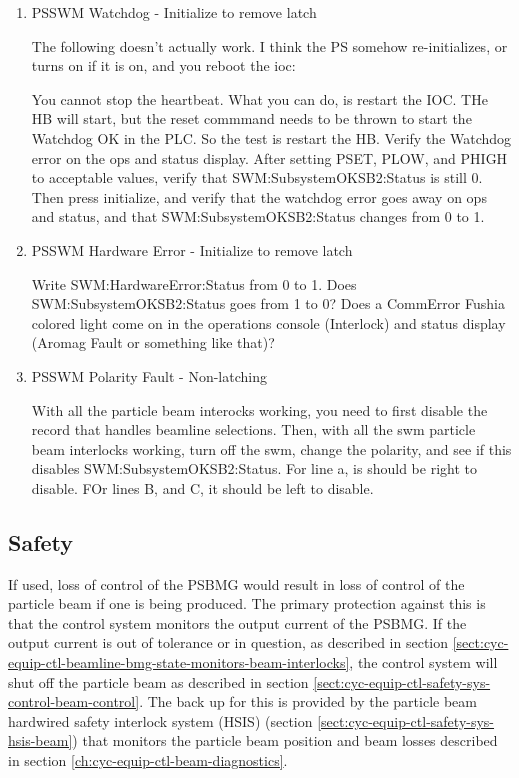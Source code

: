\documentclass[11pt]{book}		%
\begin{document}
\begin{enumerate}
 \item PSSWM Watchdog - Initialize to remove latch

\color{red}

The following doesn't actually work. I think the PS somehow re-initializes, or turns on if it is on, and you reboot the ioc:

You cannot stop the heartbeat. What you can do, is restart the IOC. THe HB will start, but the reset commmand needs to be thrown to start the Watchdog OK in the PLC. So the test is restart the HB. Verify the Watchdog error on the ops and status display. After setting PSET, PLOW, and PHIGH to acceptable values, verify that SWM:SubsystemOKSB2:Status is still 0. Then press initialize, and verify that the watchdog error goes away on ops and status, and that SWM:SubsystemOKSB2:Status changes from 0 to 1.
\color{black}

 \item PSSWM Hardware Error - Initialize to remove latch

\color{red}
Write SWM:HardwareError:Status from 0 to 1. Does SWM:SubsystemOKSB2:Status goes from 1 to 0? Does a CommError Fushia colored light come on in the operations console (Interlock) and status display (Aromag Fault or something like that)?
\color{black}

 \item PSSWM Polarity Fault - Non-latching

\color{red}
With all the particle beam interocks working, you need to first disable the record that handles beamline selections. Then, with all the swm particle beam interlocks working, turn off the swm, change the polarity, and see if this disables SWM:SubsystemOKSB2:Status. For line a, is should be right to disable. FOr lines B, and C, it should be left to disable.
\color{black}


\end{enumerate}


\subsection{Safety}

If used, loss of control of the PSBMG would result in loss of control of the particle beam if one is being produced.  The primary protection against this is that the control system monitors the output current of the PSBMG.  If the output current is out of tolerance or in question, as described in section \ref{sect:cyc-equip-ctl-beamline-bmg-state-monitors-beam-interlocks}, the control system will shut off the particle beam as described in section \ref{sect:cyc-equip-ctl-safety-sys-control-beam-control}.  The back up for this is provided by the particle beam hardwired safety interlock system (HSIS) (section \ref{sect:cyc-equip-ctl-safety-sys-hsis-beam}) that monitors the particle beam position and beam losses described in section \ref{ch:cyc-equip-ctl-beam-diagnostics}.
\end{document}
